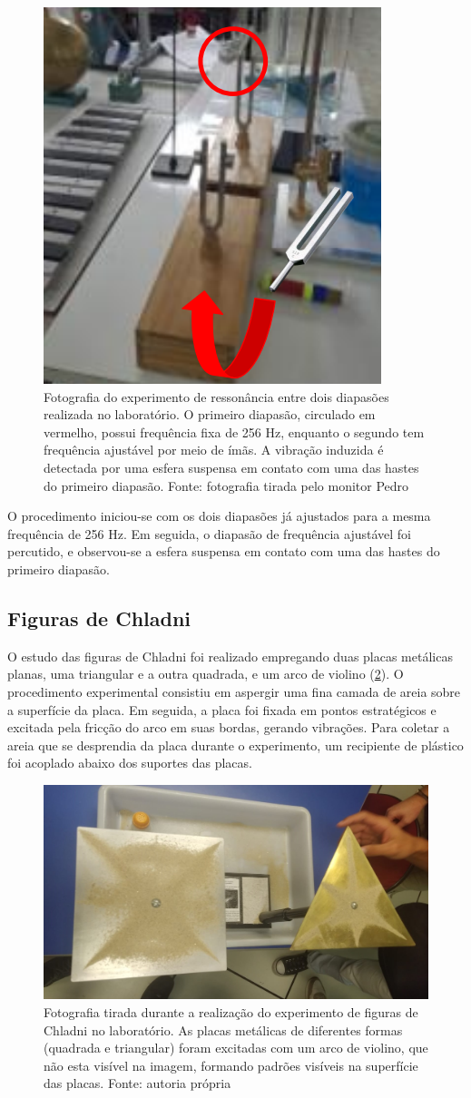 \begin{figure}[H]
    \centering
    \includegraphics[width=0.25\linewidth]{fig/ressonacia.png}
    \caption{Fotografia do experimento de ressonância entre dois diapasões realizada no laboratório. O primeiro diapasão, circulado em vermelho, possui frequência fixa de 256 Hz, enquanto o segundo tem frequência ajustável por meio de ímãs. A vibração induzida é detectada por uma esfera suspensa em contato com uma das hastes do primeiro diapasão. Fonte: fotografia tirada pelo monitor Pedro}
    \label{fig:ressonancia}
\end{figure}

O procedimento iniciou-se com os dois diapasões já ajustados para a mesma frequência de 256 Hz. Em seguida, o diapasão de frequência ajustável foi percutido, e observou-se a esfera suspensa em contato com uma das hastes do primeiro diapasão. 

\subsection{Figuras de Chladni}
O estudo das figuras de Chladni foi realizado empregando duas placas metálicas planas, uma triangular e a outra quadrada, e um arco de violino (\cref{fig:chladni}). O procedimento experimental consistiu em aspergir uma fina camada de areia sobre a superfície da placa. Em seguida, a placa foi fixada em pontos estratégicos e excitada pela fricção do arco em suas bordas, gerando vibrações. Para coletar a areia que se desprendia da placa durante o experimento, um recipiente de plástico foi acoplado abaixo dos suportes das placas.

\begin{figure}[H]
    \centering
    \includegraphics[width=0.35\linewidth]{fig/chladni.png.jpg}
    \caption{Fotografia tirada durante a realização do experimento de figuras de Chladni no laboratório. As placas metálicas de diferentes formas (quadrada e triangular) foram excitadas com um arco de violino, que não esta visível na imagem, formando padrões visíveis na superfície das placas. Fonte: autoria própria}
    \label{fig:chladni}
\end{figure}


